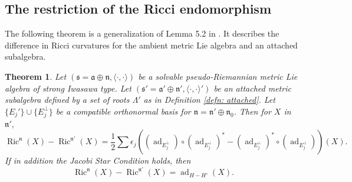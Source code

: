 \documentclass[12pt]{amsart}
\newcommand{\smallfrac}[2]{\textstyle{\frac{#1}{#2}}  }
\newcommand{\fraka}{\ensuremath{\mathfrak{a}} }
\newcommand{\frakn}{\ensuremath{\mathfrak{n}} }
\newcommand{\fraks}{\ensuremath{\mathfrak{s}} }
\renewcommand\a{{\mathfrak{a}}}
\newcommand\n{{\mathfrak{n}}}
\newcommand\ip{{\langle\cdot {,} \cdot\rangle}}
\newcommand\ad{\operatorname{ad}}
\newcommand{\Ric}{\operatorname{Ric}}
\theoremstyle{plain}
\newtheorem{theorem}{Theorem}
\theoremstyle{definition}
\theoremstyle{remark}
\numberwithin{equation}{section}
\numberwithin{theorem}{section}
\begin{document}
\subsection{The restriction of the Ricci endomorphism}

The following theorem is a generalization of Lemma 5.2 in \cite{tamaru-11}. It describes the difference in Ricci curvatures for the ambient metric Lie algebra and an attached subalgebra.
\begin{theorem}\label{thm: ricci-n-diff} 
   Let $(\fraks = \a \oplus \n,\ip)$ be a solvable  pseudo-Riemannian metric Lie algebra
   of strong Iwasawa type. 
   Let $(\fraks'= \fraka' \oplus \frakn', \ip')$ be an attached metric subalgebra defined by a set of roots $\Lambda'$
   as in Definition \ref{defn: attached}.
   Let $\{E_j'\} \cup \{E^\perp_j\}$ be a compatible orthonormal basis for $\n = \n' \oplus \n_0$.
   Then for $X$ in $\n',$  
   \[ \Ric^\n (X)  - \Ric^{\n'} (X)   = {\smallfrac{1}{2}} 
 \sum  \epsilon_j \left(  (\ad_{E_j^\perp}) \circ  (\ad_{E_j^\perp})^* -   (\ad_{E_j^\perp})^* \circ  (\ad_{E_j^\perp}) \right) (X).  
\]
 If in addition the Jacobi Star Condition holds, then
\[ \Ric^{\n} (X) - \Ric^{\n'} (X)  =  \ad_{H-H'}(X). 
\]
\end{theorem}
\end{document}
